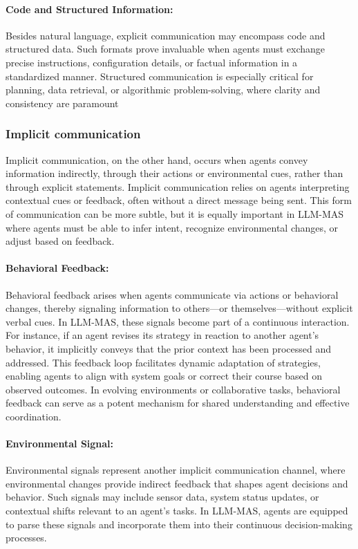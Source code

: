 \paragraph{Code and Structured Information:}
Besides natural language, explicit communication may encompass code and structured data. Such formats prove invaluable when agents must exchange precise instructions, configuration details, or factual information in a standardized manner. Structured communication is especially critical for planning, data retrieval, or algorithmic problem-solving, where clarity and consistency are paramount

\subsubsection{Implicit communication}
Implicit communication, on the other hand, occurs when agents convey information indirectly, through their actions or environmental cues, rather than through explicit statements. Implicit communication relies on agents interpreting contextual cues or feedback, often without a direct message being sent. This form of communication can be more subtle, but it is equally important in LLM-MAS where agents must be able to infer intent, recognize environmental changes, or adjust based on feedback.

\paragraph{Behavioral Feedback:}
Behavioral feedback arises when agents communicate via actions or behavioral changes, thereby signaling information to others—or themselves—without explicit verbal cues. In LLM-MAS, these signals become part of a continuous interaction. For instance, if an agent revises its strategy in reaction to another agent’s behavior, it implicitly conveys that the prior context has been processed and addressed.
This feedback loop facilitates dynamic adaptation of strategies, enabling agents to align with system goals or correct their course based on observed outcomes. In evolving environments or collaborative tasks, behavioral feedback can serve as a potent mechanism for shared understanding and effective coordination.

\paragraph{Environmental Signal:}
Environmental signals represent another implicit communication channel, where environmental changes provide indirect feedback that shapes agent decisions and behavior. Such signals may include sensor data, system status updates, or contextual shifts relevant to an agent’s tasks. In LLM-MAS, agents are equipped to parse these signals and incorporate them into their continuous decision-making processes.


